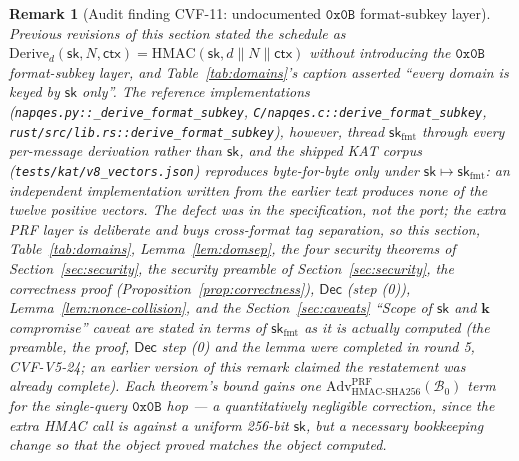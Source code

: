 \documentclass[11pt,a4paper]{article}
\newtheorem{remark}[theorem]{Remark}
\begin{document}
\begin{remark}[Audit finding CVF-11: undocumented $\texttt{0x0B}$
format-subkey layer]\label{rem:cv11}
Previous revisions of this section stated the schedule as
$\mathrm{Derive}_d(\mathsf{sk},N,\mathsf{ctx})=\mathrm{HMAC}(\mathsf{sk},d\|N\|\mathsf{ctx})$
without introducing the $\texttt{0x0B}$ format-subkey layer, and
Table~\ref{tab:domains}'s caption asserted ``every domain is keyed by
$\mathsf{sk}$ only''. The reference implementations
(\texttt{napqes.py::\_derive\_format\_subkey},
\texttt{C/napqes.c::derive\_format\_subkey},
\texttt{rust/src/lib.rs::derive\_format\_subkey}), however, thread
$\mathsf{sk}_{\mathrm{fmt}}$ through every per-message derivation rather
than $\mathsf{sk}$, and the shipped KAT corpus
(\texttt{tests/kat/v8\_vectors.json}) reproduces byte-for-byte only
under $\mathsf{sk}\mapsto\mathsf{sk}_{\mathrm{fmt}}$: an independent
implementation written from the earlier text produces \emph{none} of the
twelve positive vectors. The defect was in the specification, not the
port; the extra PRF layer is deliberate and buys cross-format tag
separation, so this section, Table~\ref{tab:domains}, Lemma~\ref{lem:domsep},
the four security theorems of Section~\ref{sec:security}, the security
preamble of Section~\ref{sec:security}, the correctness proof
(Proposition~\ref{prop:correctness}), $\mathsf{Dec}$ (step (0)),
Lemma~\ref{lem:nonce-collision}, and the Section~\ref{sec:caveats}
``Scope of $\mathsf{sk}$ and $\mathbf{k}$ compromise'' caveat are stated
in terms of $\mathsf{sk}_{\mathrm{fmt}}$ as it is actually computed
(the preamble, the proof, $\mathsf{Dec}$ step (0) and the lemma were
completed in round 5, CVF-V5-24; an earlier version of this remark claimed
the restatement was already complete). Each theorem's
bound gains one
$\mathrm{Adv}^{\mathrm{PRF}}_{\mathrm{HMAC\text{-}SHA256}}(\mathcal{B}_0)$
term for the single-query $\texttt{0x0B}$ hop — a quantitatively
negligible correction, since the extra HMAC call is against a uniform
256-bit $\mathsf{sk}$, but a necessary bookkeeping change so that the
object proved matches the object computed.
\end{remark}
\end{document}
